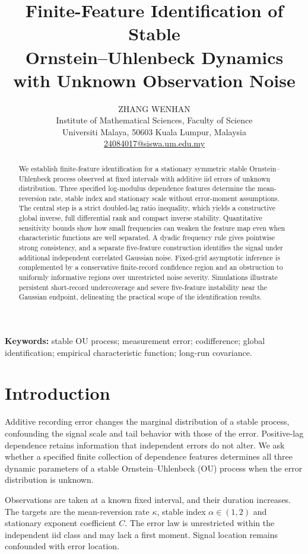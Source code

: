 \documentclass[11pt,a4paper]{article}
\title{\vspace{-1.5em}Finite-Feature Identification of Stable\\Ornstein--Uhlenbeck Dynamics\\with Unknown Observation Noise}
\author{ZHANG WENHAN\\[0.4em]
\small Institute of Mathematical Sciences, Faculty of Science\\
\small Universiti Malaya, 50603 Kuala Lumpur, Malaysia\\
\small\href{mailto:24084017@siswa.um.edu.my}{24084017@siswa.um.edu.my}}
\date{}
\theoremstyle{remark}\newtheorem{remark}[theorem]{Remark}
\begin{document}
\maketitle\thispagestyle{plain}
\begin{abstract}
We establish finite-feature identification for a stationary symmetric stable Ornstein--Uhlenbeck process observed at fixed intervals with additive iid errors of unknown distribution. Three specified log-modulus dependence features determine the mean-reversion rate, stable index and stationary scale without error-moment assumptions. The central step is a strict doubled-lag ratio inequality, which yields a constructive global inverse, full differential rank and compact inverse stability. Quantitative sensitivity bounds show how small frequencies can weaken the feature map even when characteristic functions are well separated. A dyadic frequency rule gives pointwise strong consistency, and a separate five-feature construction identifies the signal under additional independent correlated Gaussian noise. Fixed-grid asymptotic inference is complemented by a conservative finite-record confidence region and an obstruction to uniformly informative regions over unrestricted noise severity. Simulations illustrate persistent short-record undercoverage and severe five-feature instability near the Gaussian endpoint, delineating the practical scope of the identification results.
\end{abstract}
\noindent\textbf{Keywords:} stable OU process; measurement error; codifference; global identification; empirical characteristic function; long-run covariance.

\section{Introduction}
Additive recording error changes the marginal distribution of a stable process, confounding the signal scale and tail behavior with those of the error. Positive-lag dependence retains information that independent errors do not alter. We ask whether a specified finite collection of dependence features determines all three dynamic parameters of a stable Ornstein--Uhlenbeck (OU) process when the error distribution is unknown.

Observations are taken at a known fixed interval, and their duration increases. The targets are the mean-reversion rate $\kappa$, stable index $\alpha\in(1,2)$ and stationary exponent coefficient $C$. The error law is unrestricted within the independent iid class and may lack a first moment. Signal location remains confounded with error location.
\end{document}

